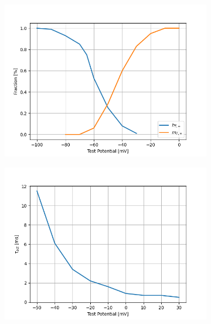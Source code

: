 \documentclass[../../workflow.tex]{subfiles}
\begin{document}
\begin{figure}[!b]
    \centering
    \begin{subfigure}[t]{0.45\textwidth}
        \centering
        \includegraphics[width=\textwidth]{./img/t_type_calcium_channel/1_activation_and_inactivation_curves.png}
        \caption{}
    \end{subfigure}
    \hfill
    \begin{subfigure}[t]{0.45\textwidth}
        \centering
        \includegraphics[width=\textwidth]{./img/t_type_calcium_channel/2_1_tau_m_jeong.png}
        \caption{}
    \end{subfigure}
    

\end{figure}
\end{document}

